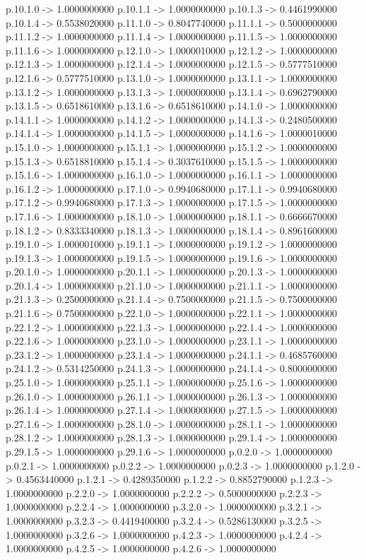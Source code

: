 p.10.1.0 -> 1.0000000000    p.10.1.1 -> 1.0000000000    p.10.1.3 -> 0.4461990000    p.10.1.4 -> 0.5538020000    p.11.1.0 -> 0.8047740000    p.11.1.1 -> 0.5000000000    p.11.1.2 -> 1.0000000000    p.11.1.4 -> 1.0000000000    p.11.1.5 -> 1.0000000000    p.11.1.6 -> 1.0000000000    p.12.1.0 -> 1.0000010000    p.12.1.2 -> 1.0000000000    p.12.1.3 -> 1.0000000000    p.12.1.4 -> 1.0000000000    p.12.1.5 -> 0.5777510000    p.12.1.6 -> 0.5777510000    p.13.1.0 -> 1.0000000000    p.13.1.1 -> 1.0000000000    p.13.1.2 -> 1.0000000000    p.13.1.3 -> 1.0000000000    p.13.1.4 -> 0.6962790000    p.13.1.5 -> 0.6518610000    p.13.1.6 -> 0.6518610000    p.14.1.0 -> 1.0000000000    p.14.1.1 -> 1.0000000000    p.14.1.2 -> 1.0000000000    p.14.1.3 -> 0.2480500000    p.14.1.4 -> 1.0000000000    p.14.1.5 -> 1.0000000000    p.14.1.6 -> 1.0000010000    p.15.1.0 -> 1.0000000000    p.15.1.1 -> 1.0000000000    p.15.1.2 -> 1.0000000000    p.15.1.3 -> 0.6518810000    p.15.1.4 -> 0.3037610000    p.15.1.5 -> 1.0000000000    p.15.1.6 -> 1.0000000000    p.16.1.0 -> 1.0000000000    p.16.1.1 -> 1.0000000000    p.16.1.2 -> 1.0000000000    p.17.1.0 -> 0.9940680000    p.17.1.1 -> 0.9940680000    p.17.1.2 -> 0.9940680000    p.17.1.3 -> 1.0000000000    p.17.1.5 -> 1.0000000000    p.17.1.6 -> 1.0000000000    p.18.1.0 -> 1.0000000000    p.18.1.1 -> 0.6666670000    p.18.1.2 -> 0.8333340000    p.18.1.3 -> 1.0000000000    p.18.1.4 -> 0.8961600000    p.19.1.0 -> 1.0000010000    p.19.1.1 -> 1.0000000000    p.19.1.2 -> 1.0000000000    p.19.1.3 -> 1.0000000000    p.19.1.5 -> 1.0000000000    p.19.1.6 -> 1.0000000000    p.20.1.0 -> 1.0000000000    p.20.1.1 -> 1.0000000000    p.20.1.3 -> 1.0000000000    p.20.1.4 -> 1.0000000000    p.21.1.0 -> 1.0000000000    p.21.1.1 -> 1.0000000000    p.21.1.3 -> 0.2500000000    p.21.1.4 -> 0.7500000000    p.21.1.5 -> 0.7500000000    p.21.1.6 -> 0.7500000000    p.22.1.0 -> 1.0000000000    p.22.1.1 -> 1.0000000000    p.22.1.2 -> 1.0000000000    p.22.1.3 -> 1.0000000000    p.22.1.4 -> 1.0000000000    p.22.1.6 -> 1.0000000000    p.23.1.0 -> 1.0000000000    p.23.1.1 -> 1.0000000000    p.23.1.2 -> 1.0000000000    p.23.1.4 -> 1.0000000000    p.24.1.1 -> 0.4685760000    p.24.1.2 -> 0.5314250000    p.24.1.3 -> 1.0000000000    p.24.1.4 -> 0.8000000000    p.25.1.0 -> 1.0000000000    p.25.1.1 -> 1.0000000000    p.25.1.6 -> 1.0000000000    p.26.1.0 -> 1.0000000000    p.26.1.1 -> 1.0000000000    p.26.1.3 -> 1.0000000000    p.26.1.4 -> 1.0000000000    p.27.1.4 -> 1.0000000000    p.27.1.5 -> 1.0000000000    p.27.1.6 -> 1.0000000000    p.28.1.0 -> 1.0000000000    p.28.1.1 -> 1.0000000000    p.28.1.2 -> 1.0000000000    p.28.1.3 -> 1.0000000000    p.29.1.4 -> 1.0000000000    p.29.1.5 -> 1.0000000000    p.29.1.6 -> 1.0000000000    p.0.2.0 -> 1.0000000000    p.0.2.1 -> 1.0000000000    p.0.2.2 -> 1.0000000000    p.0.2.3 -> 1.0000000000    p.1.2.0 -> 0.4563440000    p.1.2.1 -> 0.4289350000    p.1.2.2 -> 0.8852790000    p.1.2.3 -> 1.0000000000    p.2.2.0 -> 1.0000000000    p.2.2.2 -> 0.5000000000    p.2.2.3 -> 1.0000000000    p.2.2.4 -> 1.0000000000    p.3.2.0 -> 1.0000000000    p.3.2.1 -> 1.0000000000    p.3.2.3 -> 0.4419400000    p.3.2.4 -> 0.5286130000    p.3.2.5 -> 1.0000000000    p.3.2.6 -> 1.0000000000    p.4.2.3 -> 1.0000000000    p.4.2.4 -> 1.0000000000    p.4.2.5 -> 1.0000000000    p.4.2.6 -> 1.0000000000  